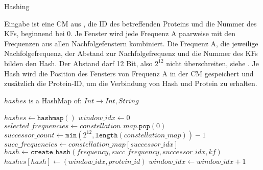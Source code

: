         \begin{algorithm}[H]
            \caption{Hashing}\label{alg:hashing}
            Eingabe ist eine \acl{CM} aus , die ID des betreffenden Proteins und die Nummer des \acl{KF}s, beginnend bei 0. Je Fenster wird jede Frequenz A paarweise mit den Frequenzen aus allen Nachfolgefenstern kombiniert. Die Frequenz A, die jeweilige Nachfolgefrequenz, der Abstand zur Nachfolgefrequenz und die Nummer des \acl{KF}s bilden den Hash. Der Abstand darf 12 Bit, also $2^{12}$ nicht überschreiten, siehe . Je Hash wird die Position des Fensters von Frequenz A in der \acl{CM} gespeichert und zusätzlich die Protein-ID, um die Verbindung von Hash und Protein zu erhalten.
            \begin{algorithmic}[1]
                \Ensure $hashes$ is a HashMap of: $Int \rightarrow Int, String$

                \State $hashes \gets \texttt{hashmap}()$
                \State $window\_idx \gets 0$
                \Repeat
                    \State $selected\_frequencies \gets constellation\_map.\texttt{pop}(0)$
                        \State $successor\_count \gets \texttt{min}(2^{12}, \texttt{length}(constellation\_map)) - 1$
                            \State $succ\_frequencies \gets constellation\_map[successor\_idx]$
                                \State $hash \gets \texttt{create\_hash}(frequency, succ\_frequency, successor\_idx, kf)$
                                \State $hashes[hash] \gets (window\_idx, protein\_id)$
                            \EndFor
                        \EndFor
                    \EndFor
                    \State $window\_idx \gets window\_idx + 1$
            \end{algorithmic}
        \end{algorithm}

